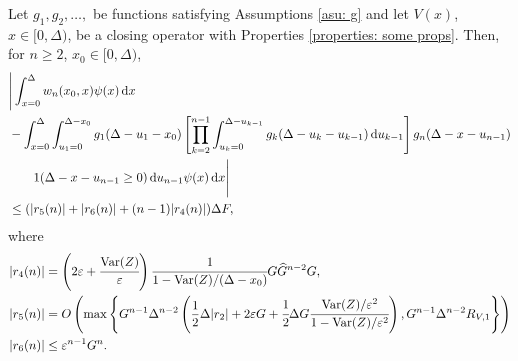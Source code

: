 \begin{cor}\label{eqn: lafkjebjcbbalbvvbrb}
	 Let \(g_1,g_2,\dots,\) be functions satisfying Assumptions \ref{asu: g} and let \(V(x)\), \(x\in[0,\Delta)\), be a closing operator with Properties \ref{properties: some props}. Then, for \(n\geq 2\), \(x_0\in[0,\Delta)\), 
	\begin{align}
		&\Bigg| \int_{x=0}^\Delta w_n(x_0,x) \psi(x) \, \mathrm{d} x \nonumber 
		\\&{}- \int_{x=0}^\Delta \int_{u_1=0}^{\Delta-x_0}g_1(\Delta - u_1 - x_0)
		\left[\prod_{k=2}^{n-1} \int_{u_k=0}^{\Delta-u_{k-1}} g_k(\Delta-u_k-u_{k-1})\, \mathrm{d} u_{k-1}\right] \nonumber 
            	g_{n}(\Delta - x-u_{n-1})
	\\&\qquad{} 1(\Delta-x-u_{n-1}\geq0) \, \mathrm{d} u_{n-1}\psi(x) \, \mathrm{d} x \Bigg| \nonumber
		\\&\leq (|r_5(n)| + |r_6(n)| + (n-1)|r_4(n)|)\Delta F, \label{eqn: rhs gs 4dvfklsmv}
	\end{align}
	where 
	\begin{align*}
		|r_4(n)| &= \left(2\varepsilon + \cfrac{\mathrm{Var}(Z)}{\varepsilon}\right) \cfrac{1}{1-\mathrm{Var}(Z)/(\Delta-x_0)} G \widehat G^{n-2} G ,
		\\|r_5(n)|&= O\left(\max\left\{G^{n-1}\Delta^{n-2}\left(\frac{1}{2}\Delta|r_2 |+ 2\varepsilon G 
		+ \cfrac{1}{2}\Delta G\cfrac{\mathrm{Var}(Z)/\varepsilon^2}{1-\mathrm{Var}(Z)/\varepsilon^2}\right),
		G^{n-1}\Delta^{n-2}R_{V,1}\right\}\right)
		\\|r_6(n)| &\leq\varepsilon^{n-1}G^n.
	\end{align*}
\end{cor}

